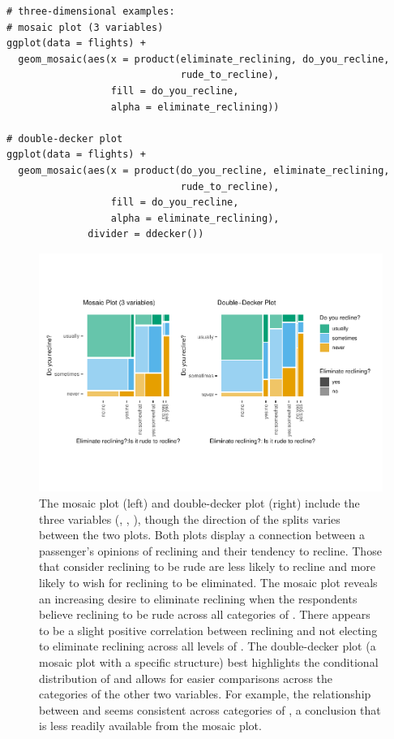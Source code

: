 \begin{verbatim}
# three-dimensional examples:
# mosaic plot (3 variables)
ggplot(data = flights) +
  geom_mosaic(aes(x = product(eliminate_reclining, do_you_recline,
                              rude_to_recline),
                  fill = do_you_recline, 
                  alpha = eliminate_reclining))

# double-decker plot
ggplot(data = flights) +
  geom_mosaic(aes(x = product(do_you_recline, eliminate_reclining,
                              rude_to_recline), 
                  fill = do_you_recline, 
                  alpha = eliminate_reclining),
              divider = ddecker())
\end{verbatim}

\begin{figure}[!h]

{\centering \includegraphics[width=1\linewidth]{jeppson-hofmann_files/figure-latex/variety3-1} 

}

\caption{The mosaic plot (left) and double-decker plot (right) include the three variables (, , ), though the direction of the splits varies between the two plots. Both plots display a connection between a passenger's opinions of reclining and their tendency to recline. Those that consider reclining to be rude are less likely to recline and more likely to wish for reclining to be eliminated. The mosaic plot reveals an increasing desire to eliminate reclining when the respondents believe reclining to be rude across all categories of . There appears to be a slight positive correlation between reclining and not electing to eliminate reclining across all levels of . The double-decker plot (a mosaic plot with a specific structure) best highlights the conditional distribution of  and allows for easier comparisons across the categories of the other two variables. For example, the relationship between  and  seems consistent across categories of , a conclusion that is less readily available from the mosaic plot.}\label{fig:variety3}
\end{figure}


